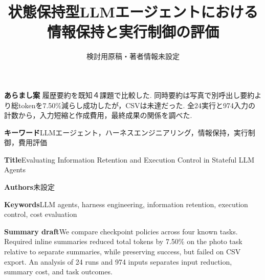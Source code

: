 \documentclass[uplatex,a4paper,twocolumn,10pt]{jsarticle}
\title{状態保持型LLMエージェントにおける\newline 情報保持と実行制御の評価}
\author{検討用原稿・著者情報未設定}
\date{}
\begin{document}
\raggedbottom
\maketitle
\noindent\textbf{あらまし案}\quad
履歴要約を既知４課題で比較した. 同時要約は写真で別呼出し要約より総tokenを7.50\%減らし成功したが，CSVは未達だった. 全24実行と974入力の計数から，入力短縮と作成費用，最終成果の関係を調べた.

\noindent\textbf{キーワード}\quad LLMエージェント，ハーネスエンジニアリング，情報保持，実行制御，費用評価








\clearpage
\onecolumn
\noindent\textbf{Title}\quad Evaluating Information Retention and Execution Control in Stateful LLM Agents

\noindent\textbf{Authors}\quad 未設定

\noindent\textbf{Keywords}\quad LLM agents, harness engineering, information retention, execution control, cost evaluation

\noindent\textbf{Summary draft}\quad We compare checkpoint policies across four known tasks. Required inline summaries reduced total tokens by 7.50\% on the photo task relative to separate summaries, while preserving success, but failed on CSV export. An analysis of 24 runs and 974 inputs separates input reduction, summary cost, and task outcomes.
\end{document}
